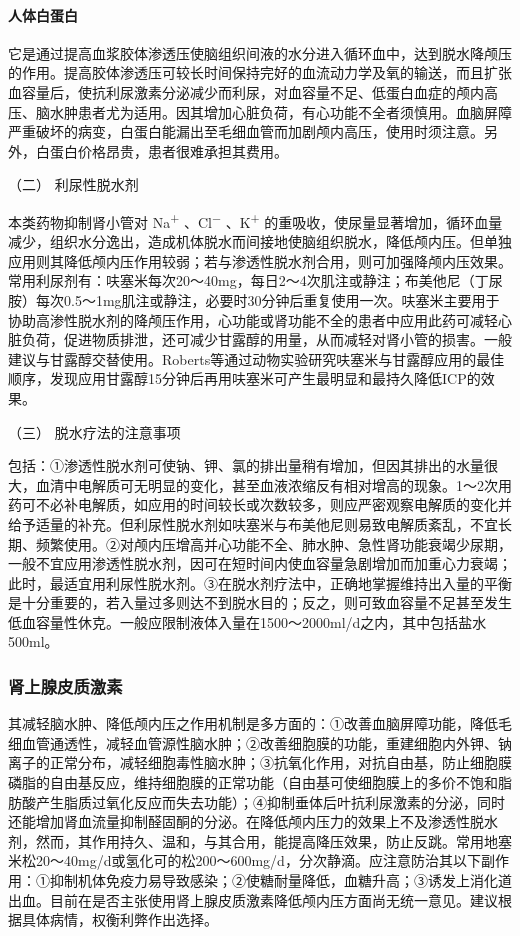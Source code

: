 \paragraph{人体白蛋白}

它是通过提高血浆胶体渗透压使脑组织间液的水分进入循环血中，达到脱水降颅压的作用。提高胶体渗透压可较长时间保持完好的血流动力学及氧的输送，而且扩张血容量后，使抗利尿激素分泌减少而利尿，对血容量不足、低蛋白血症的颅内高压、脑水肿患者尤为适用。因其增加心脏负荷，有心功能不全者须慎用。血脑屏障严重破坏的病变，白蛋白能漏出至毛细血管而加剧颅内高压，使用时须注意。另外，白蛋白价格昂贵，患者很难承担其费用。

\hypertarget{text00107.htmlux5cux23CHP4-6-3-3-2}{}
（二） 利尿性脱水剂

本类药物抑制肾小管对 Na\textsuperscript{+} 、Cl\textsuperscript{−}
、K\textsuperscript{+}
的重吸收，使尿量显著增加，循环血量减少，组织水分逸出，造成机体脱水而间接地使脑组织脱水，降低颅内压。但单独应用则其降低颅内压作用较弱；若与渗透性脱水剂合用，则可加强降颅内压效果。常用利尿剂有：呋塞米每次20～40mg，每日2～4次肌注或静注；布美他尼（丁尿胺）每次0.5～1mg肌注或静注，必要时30分钟后重复使用一次。呋塞米主要用于协助高渗性脱水剂的降颅压作用，心功能或肾功能不全的患者中应用此药可减轻心脏负荷，促进物质排泄，还可减少甘露醇的用量，从而减轻对肾小管的损害。一般建议与甘露醇交替使用。Roberts等通过动物实验研究呋塞米与甘露醇应用的最佳顺序，发现应用甘露醇15分钟后再用呋塞米可产生最明显和最持久降低ICP的效果。

\hypertarget{text00107.htmlux5cux23CHP4-6-3-3-3}{}
（三） 脱水疗法的注意事项

包括：①渗透性脱水剂可使钠、钾、氯的排出量稍有增加，但因其排出的水量很大，血清中电解质可无明显的变化，甚至血液浓缩反有相对增高的现象。1～2次用药可不必补电解质，如应用的时间较长或次数较多，则应严密观察电解质的变化并给予适量的补充。但利尿性脱水剂如呋塞米与布美他尼则易致电解质紊乱，不宜长期、频繁使用。②对颅内压增高并心功能不全、肺水肿、急性肾功能衰竭少尿期，一般不宜应用渗透性脱水剂，因可在短时间内使血容量急剧增加而加重心力衰竭；此时，最适宜用利尿性脱水剂。③在脱水剂疗法中，正确地掌握维持出入量的平衡是十分重要的，若入量过多则达不到脱水目的；反之，则可致血容量不足甚至发生低血容量性休克。一般应限制液体入量在1500～2000ml/d之内，其中包括盐水500ml。

\subsubsection{肾上腺皮质激素}

其减轻脑水肿、降低颅内压之作用机制是多方面的：①改善血脑屏障功能，降低毛细血管通透性，减轻血管源性脑水肿；②改善细胞膜的功能，重建细胞内外钾、钠离子的正常分布，减轻细胞毒性脑水肿；③抗氧化作用，对抗自由基，防止细胞膜磷脂的自由基反应，维持细胞膜的正常功能（自由基可使细胞膜上的多价不饱和脂肪酸产生脂质过氧化反应而失去功能）；④抑制垂体后叶抗利尿激素的分泌，同时还能增加肾血流量抑制醛固酮的分泌。在降低颅内压力的效果上不及渗透性脱水剂，然而，其作用持久、温和，与其合用，能提高降压效果，防止反跳。常用地塞米松20～40mg/d或氢化可的松200～600mg/d，分次静滴。应注意防治其以下副作用：①抑制机体免疫力易导致感染；②使糖耐量降低，血糖升高；③诱发上消化道出血。目前在是否主张使用肾上腺皮质激素降低颅内压方面尚无统一意见。建议根据具体病情，权衡利弊作出选择。

